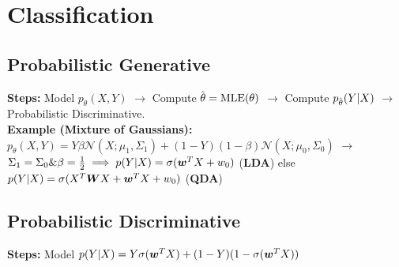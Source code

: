 \section*{Classification}


\subsection*{\color{red}Probabilistic Generative}
\textbf{Steps:} Model $p_\theta(X,Y)$ $\rightarrow$ Compute $\hat{\kern0pt \theta} = \mathrm{MLE}(\theta)$ $\rightarrow$ Compute $p_{\hat{\kern0pt \theta}}(Y|X)$ $\rightarrow$ Probabilistic Discriminative.\\
\textbf{Example (Mixture of Gaussians):} $p_\theta(X,Y)=Y\beta\mathcal{N}(X;\mu_1,\Sigma_1)+(1-Y)(1-\beta)\mathcal{N}(X;\mu_0,\Sigma_0)$ $\rightarrow$ $\Sigma_1=\Sigma_0 \& \beta=\frac{1}{2} \implies p(Y|X) = \sigma({\bm{w}}^TX + w_0)$ (\textbf{LDA}) else $p(Y|X) = \sigma(X^T{\bm{W}} X + {\bm{w}}^TX + w_0)$ (\textbf{QDA})
\subsection*{\color{orange}Probabilistic Discriminative}
\textbf{Steps:} Model $p(Y|X) = Y\sigma({\bm{w}}^TX)+(1-Y)(1-\sigma({\bm{w}}^TX))$

